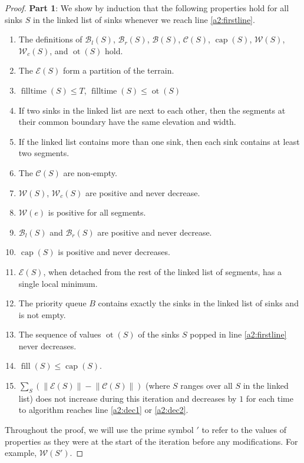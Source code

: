 \documentclass[11pt,a4paper]{article}
\newcommand{\norm}[1]{\left\lVert #1 \right\rVert}
\DeclareMathOperator{\capp}{cap}
\DeclareMathOperator{\ot}{ot}
\DeclareMathOperator{\Fill}{fill}
\DeclareMathOperator{\filltime}{filltime}
\begin{document}
\begin{proof}
\textbf{Part 1}:
We show by induction that the following properties hold for all sinks $S$ in the linked list of sinks whenever we reach line \ref{a2:firstline}.
\begin{enumerate}[label=\textbf{\Roman*}]
\item The definitions of $\mathcal{B}_l(S)$, $\mathcal{B}_r(S)$, $\mathcal{B}(S)$, $\mathcal{C}(S)$, $\capp(S)$, $\mathcal{W}(S)$, $\mathcal{W}_c(S)$, and $\ot(S)$ hold.\label{e1}
\item The $\mathcal{E}(S)$ form a partition of the terrain.\label{e2}
\item $\filltime(S) \le T$, $\filltime(S) \le \ot(S)$\label{e3}
\item If two sinks in the linked list are next to each other, then the segments at their common boundary have the same elevation and width.\label{e4} 
\item If the linked list contains more than one sink, then each sink contains at least two segments.\label{e6}
\item The $\mathcal{C}(S)$ are non-empty.\label{e7}
\item $\mathcal{W}(S)$, $\mathcal{W}_c(S)$ are positive and never decrease.\label{e8}
\item $\mathcal{W}(e)$ is positive for all segments.\label{e9}
\item $\mathcal{B}_l(S)$ and $\mathcal{B}_r(S)$ are positive and never decrease.\label{e10}
\item $\capp(S)$ is positive and never decreases.\label{e11}
\item $\mathcal{E}(S)$, when detached from the rest of the linked list of segments, has a single local minimum.\label{e12}
\item The priority queue $B$ contains exactly the sinks in the linked list of sinks and is not empty.\label{e13}
\item The sequence of values $\ot(S)$ of the sinks $S$ popped in line \ref{a2:firstline} never decreases.\label{e15}
\item $\Fill(S) \le \capp(S)$.\label{e16}
\item $\sum_S\left(\norm{\mathcal{E}(S)} - \norm{\mathcal{C}(S)}\right)$ (where $S$ ranges over all $S$ in the linked list) does not increase during this iteration and decreases by $1$ for each time to algorithm reaches line \ref{a2:dec1} or \ref{a2:dec2}.\label{e17}
\end{enumerate}

Throughout the proof, we will use the prime symbol $'$ to refer to the values of properties as they were at the start of the iteration before any modifications.
For example, $\mathcal{W}(S')$.


\end{proof}
\end{document}
